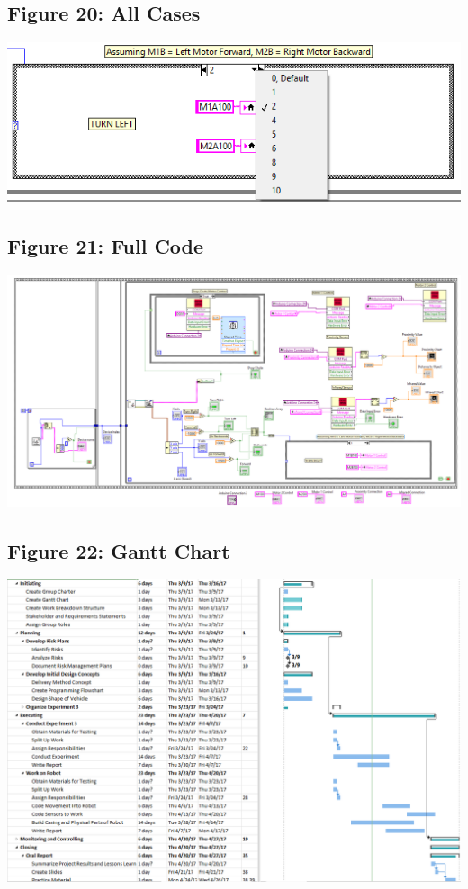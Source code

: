 \documentclass{article}
\begin{document}
\subsection{Figure 20: All Cases}
\begin{center}{ \includegraphics[width=\textwidth]{CaseState.png}}\end{center}

\subsection{Figure 21: Full Code}
\begin{center}{ \includegraphics[width=\textwidth]{FullCode.png}}\end{center}

\subsection{Figure 22: Gantt Chart}
\includegraphics[width=\textwidth]{GanttChart.png}
\end{document}
